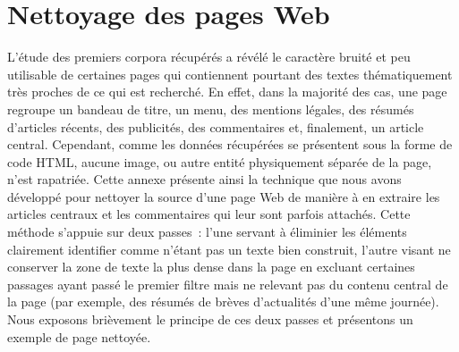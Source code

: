 \chapter{Nettoyage des pages Web}
\label{app:nettoyage}
L'étude des premiers corpora récupérés a révélé le caractère bruité et peu
utilisable de certaines pages qui contiennent pourtant des textes thématiquement
très proches de ce qui est recherché. En effet, dans la majorité des cas, une
page regroupe un bandeau de titre, un menu, des mentions légales, des résumés
d'articles récents, des publicités, des commentaires et, finalement, un article
central. Cependant, comme les données récupérées se présentent sous la forme de
code HTML, aucune image, ou autre entité physiquement séparée de la page, n'est
rapatriée. Cette annexe présente ainsi la technique que nous avons développé
pour nettoyer la source d'une page Web de manière à en extraire les
articles centraux et les commentaires qui leur sont parfois
attachés. Cette méthode s'appuie sur deux passes~: l'une servant à éliminier
les éléments clairement identifier comme n'étant pas un texte bien construit,
l'autre visant ne conserver la zone de texte la plus dense dans la page
en excluant certaines passages ayant passé le premier filtre mais ne relevant
pas du contenu central de la page (par exemple, des résumés de brèves
d'actualités d'une même journée). Nous exposons brièvement le principe de ces
deux passes et présentons un exemple de page nettoyée.

